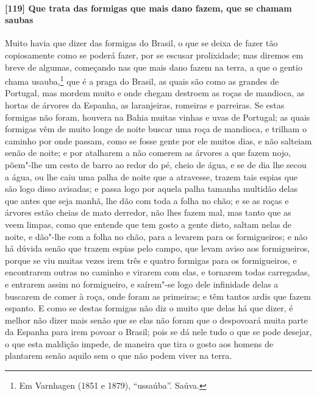 \paragraph{[119] Que trata das formigas que mais dano fazem, que se chamam saubas}\quad
Muito havia que dizer das formigas do Brasil, o que se deixa de fazer tão copiosamente
como se poderá fazer, por se escusar prolixidade; mas diremos em breve de algumas,
começando nas que mais dano fazem na terra, a que o gentio chama usauba,\footnote{ Em
Varnhagen (1851 e 1879), ``ussaúba''. Saúva.} que é a praga do Brasil, as quais são como
as grandes de Portugal, mas mordem muito e onde chegam destroem as roças de mandioca, as
hortas de árvores da Espanha, as laranjeiras, romeiras e parreiras. Se estas formigas não
foram, houvera na Bahia muitas vinhas e uvas de Portugal; as quais formigas vêm de muito
longe de noite buscar uma roça de mandioca, e trilham o caminho por onde passam, como se
fosse gente por ele muitos dias, e não salteiam senão de noite; e por atalharem a não
comerem as árvores a que fazem nojo, põem"-lhe um cesto de barro ao redor do pé, cheio de
água, e se de dia lhe secou a água, ou lhe caiu uma palha de noite que a atravesse, trazem
tais espias que são logo disso avisadas; e passa logo por aquela palha tamanha multidão
delas que antes que seja manhã, lhe dão com toda a folha no chão; e se as roças e árvores
estão cheias de mato derredor, não lhes fazem mal, mas tanto que as veem limpas, como que
entende que tem gosto a gente disto, saltam nelas de noite, e dão"-lhe com a folha no chão,
para a levarem para os formigueiros; e não há dúvida senão que trazem espias pelo campo,
que levam aviso aos formigueiros, porque se viu muitas vezes irem três e quatro formigas
para os formigueiros, e encontrarem outras no caminho e virarem com elas, e tornarem todas
carregadas, e entrarem assim no formigueiro, e saírem"-se logo dele infinidade delas a
buscarem de comer à roça, onde foram as primeiras; e têm tantos ardis que fazem espanto. E
como se destas formigas não diz o muito que delas há que dizer, é melhor não dizer mais
senão que se elas não foram que o despovoará muita parte da Espanha para irem povoar o
Brasil; pois se dá nele tudo o que se pode desejar, o que esta maldição impede, de maneira
que tira o gosto aos homens de plantarem senão aquilo sem o que não podem viver na terra.

